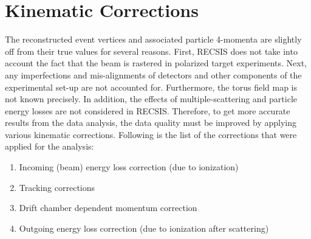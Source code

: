 \section{Kinematic Corrections}
\label{cha:KineCor}
The reconstructed event vertices and associated particle 4-momenta are slightly off from their true values for several reasons. First, %
RECSIS does not take into account the fact that the beam is rastered in polarized target experiments. Next, any 
imperfections and mis-alignments of detectors and other components of the experimental set-up are not accounted for. 
Furthermore, the torus field map is not known precisely. 
In addition, the effects of multiple-scattering and particle energy losses are not considered in RECSIS. %
Therefore, to get more accurate results from the data analysis, the data quality must be improved by applying various kinematic corrections. Following is the list of the corrections that were applied for %
the analysis:

\begin{enumerate}
\item Incoming (beam) energy loss correction (due to ionization) 
\item Tracking corrections
\item Drift chamber dependent momentum correction
\item Outgoing energy loss correction (due to ionization after scattering) %
\end{enumerate}



